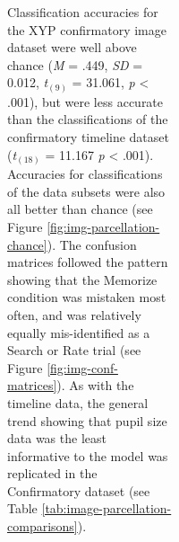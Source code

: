 \documentclass[
  english,
  man, donotrepeattitle,floatsintext]{apa6}
\begin{document}
\begin{figure}
\begin{figure}
\begin{figure}
\begin{figure}
Classification accuracies for the XYP confirmatory image dataset were well above chance (\emph{M} = .449, \emph{SD} = 0.012, \emph{t}\(_{(9)}\) = 31.061, \emph{p} \textless{} .001), but were less accurate than the classifications of the confirmatory timeline dataset (\emph{t}\(_{(18)}\) = 11.167 \emph{p} \textless{} .001). Accuracies for classifications of the data subsets were also all better than chance (see Figure \ref{fig:img-parcellation-chance}). The confusion matrices followed the pattern showing that the Memorize condition was mistaken most often, and was relatively equally mis-identified as a Search or Rate trial (see Figure \ref{fig:img-conf-matrices}). As with the timeline data, the general trend showing that pupil size data was the least informative to the model was replicated in the Confirmatory dataset (see Table \ref{tab:image-parcellation-comparisons}).


\end{figure}
\end{figure}
\end{figure}
\end{figure}
\end{document}
